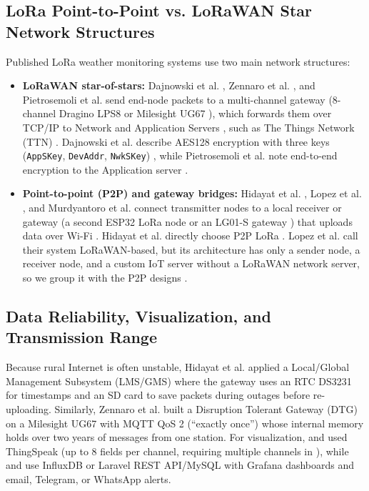 \documentclass[conference,onecolumn]{IEEEtran}
\begin{document}
\subsection{LoRa Point-to-Point vs. LoRaWAN Star Network Structures}
Published LoRa weather monitoring systems use two main network structures:
\begin{itemize}
    \item \textbf{LoRaWAN star-of-stars:} Dajnowski et al. \cite{dajnowski2024}, Zennaro et al. \cite{zennaro2025}, and Pietrosemoli et al. \cite{pietrosemoli2019} send end-node packets to a multi-channel gateway (8-channel Dragino LPS8 \cite{dajnowski2024} or Milesight UG67 \cite{zennaro2025}), which forwards them over TCP/IP to Network and Application Servers \cite{dajnowski2024, zennaro2025, pietrosemoli2019}, such as The Things Network (TTN) \cite{dajnowski2024, pietrosemoli2019}. Dajnowski et al. describe AES128 encryption with three keys (\texttt{AppSKey}, \texttt{DevAddr}, \texttt{NwkSKey}) \cite{dajnowski2024}, while Pietrosemoli et al. note end-to-end encryption to the Application server \cite{pietrosemoli2019}.
    \item \textbf{Point-to-point (P2P) and gateway bridges:} Hidayat et al. \cite{hidayat2019}, Lopez et al. \cite{lopez2025}, and Murdyantoro et al. \cite{murdyantoro2019} connect transmitter nodes to a local receiver or gateway (a second ESP32 LoRa node \cite{hidayat2019, lopez2025} or an LG01-S gateway \cite{murdyantoro2019}) that uploads data over Wi-Fi \cite{hidayat2019, lopez2025, murdyantoro2019}. Hidayat et al. directly choose P2P LoRa \cite{hidayat2019}. Lopez et al. call their system LoRaWAN-based, but its architecture has only a sender node, a receiver node, and a custom IoT server without a LoRaWAN network server, so we group it with the P2P designs \cite{lopez2025}.
\end{itemize}

\subsection{Data Reliability, Visualization, and Transmission Range}
Because rural Internet is often unstable, Hidayat et al. \cite{hidayat2019} applied a Local/Global Management Subsystem (LMS/GMS) where the gateway uses an RTC DS3231 for timestamps and an SD card to save packets during outages before re-uploading. Similarly, Zennaro et al. \cite{zennaro2025} built a Disruption Tolerant Gateway (DTG) on a Milesight UG67 with MQTT QoS 2 (``exactly once'') whose internal memory holds over two years of messages from one station. For visualization, \cite{dajnowski2024} and \cite{murdyantoro2019} used ThingSpeak (up to 8 fields per channel, requiring multiple channels in \cite{dajnowski2024}), while \cite{zennaro2025} and \cite{lopez2025} use InfluxDB or Laravel REST API/MySQL with Grafana dashboards and email, Telegram, or WhatsApp alerts.
\end{document}
